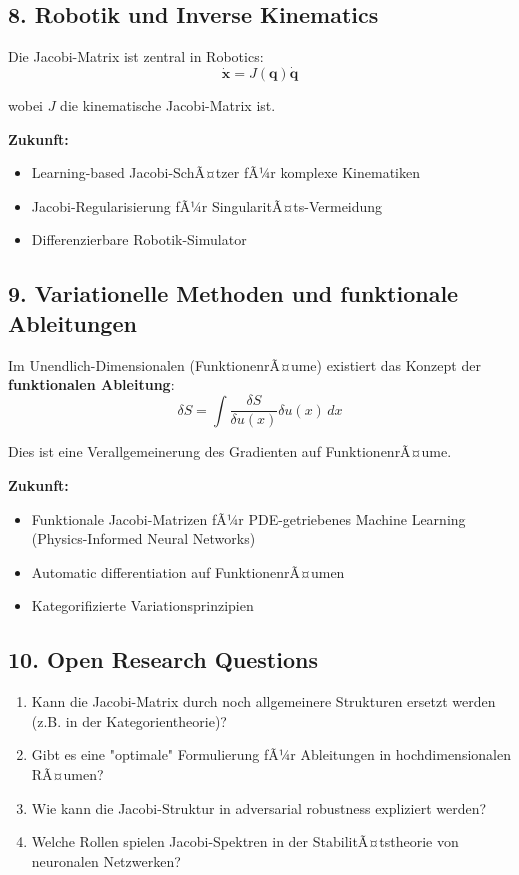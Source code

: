 ﻿\documentclass[a4paper,12pt]{article}
\theoremstyle{definition}
\begin{document}
\subsection{8. Robotik und Inverse Kinematics}

Die Jacobi-Matrix ist zentral in Robotics:
\[
\dot{\boldsymbol{x}} = J(\boldsymbol{q}) \dot{\boldsymbol{q}}
\]

wobei $J$ die kinematische Jacobi-Matrix ist.

\textbf{Zukunft:}
\begin{itemize}
	\item Learning-based Jacobi-SchÃ¤tzer fÃ¼r komplexe Kinematiken
	\item Jacobi-Regularisierung fÃ¼r SingularitÃ¤ts-Vermeidung
	\item Differenzierbare Robotik-Simulator
\end{itemize}

\subsection{9. Variationelle Methoden und funktionale Ableitungen}

Im Unendlich-Dimensionalen (FunktionenrÃ¤ume) existiert das Konzept der \textbf{funktionalen Ableitung}:
\[
\delta S = \int \frac{\delta S}{\delta u(x)} \delta u(x) \, dx
\]

Dies ist eine Verallgemeinerung des Gradienten auf FunktionenrÃ¤ume.

\textbf{Zukunft:}
\begin{itemize}
	\item Funktionale Jacobi-Matrizen fÃ¼r PDE-getriebenes Machine Learning (Physics-Informed Neural Networks)
	\item Automatic differentiation auf FunktionenrÃ¤umen
	\item Kategorifizierte Variationsprinzipien
\end{itemize}

\subsection{10. Open Research Questions}

\begin{enumerate}
	\item Kann die Jacobi-Matrix durch noch allgemeinere Strukturen ersetzt werden (z.B. in der Kategorientheorie)?
	\item Gibt es eine "optimale" Formulierung fÃ¼r Ableitungen in hochdimensionalen RÃ¤umen?
	\item Wie kann die Jacobi-Struktur in adversarial robustness expliziert werden?
	\item Welche Rollen spielen Jacobi-Spektren in der StabilitÃ¤tstheorie von neuronalen Netzwerken?
\end{enumerate}
\end{document}
